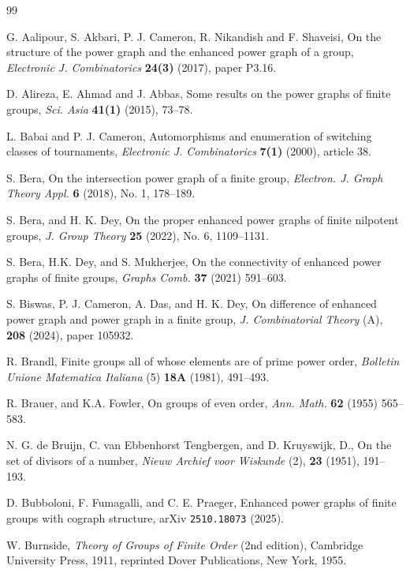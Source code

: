 \documentclass[12pt]{amsart}
\theoremstyle{plain}
\theoremstyle{remark}
\theoremstyle{definition}
\begin{document}
\begin{thebibliography}{99}

G. Aalipour, S. Akbari, P. J. Cameron, R. Nikandish and F. Shaveisi,
On the structure of the power graph and the enhanced power graph of a group,
\textit{Electronic J. Combinatorics} \textbf{24(3)} (2017), paper P3.16.

D. Alireza, E. Ahmad and J. Abbas, Some results on the power graphs of finite groups,
 \textit{Sci. Asia} \textbf{41(1)} (2015), 73--78.

L. Babai and P. J. Cameron, 
Automorphisms and enumeration of switching classes of tournaments,
\textit{Electronic J. Combinatorics} \textbf{7(1)} (2000), article 38.

S. Bera,
On the intersection power graph of a finite group,
\textit{Electron. J. Graph Theory Appl.} \textbf{6} (2018), No. 1, 178--189.

S. Bera, and H. K. Dey,
On the proper enhanced power graphs of finite nilpotent groups,
\textit{J.  Group Theory} \textbf{25} (2022), No. 6, 1109--1131.

S. Bera, H.K. Dey, and S. Mukherjee, On the connectivity of enhanced power graphs of finite groups,
\textit{Graphs Comb.} \textbf{37} (2021) 591--603.

S. Biswas, P. J. Cameron, A. Das, and H. K. Dey,
On difference of enhanced power graph and power graph in a finite group,
\textit{J. Combinatorial Theory} (A), \textbf{208} (2024), paper 105932.

R. Brandl,
Finite groups all of whose elements are of prime power order,
\textit{Bolletin Unione Matematica Italiana} (5) \textbf{18A} (1981), 491--493.

 R. Brauer, and K.A. Fowler, On groups of even order, \textit{Ann. Math.} \textbf{62} (1955) 565--583.

N. G. de Bruijn, C. van Ebbenhorst Tengbergen, and D. Kruyswijk, D.,
On the set of divisors of a number,
\textit{Nieuw Archief voor Wiskunde} (2), \textbf{23} (1951), 191--193.

D. Bubboloni, F. Fumagalli, and C. E. Praeger,
Enhanced power graphs of finite groups with cograph structure,
arXiv \texttt{2510.18073} (2025).

W. Burnside,
\textit{Theory of Groups of Finite Order} (2nd edition),
Cambridge University Press, 1911, reprinted Dover Publications, New York, 1955.


\end{thebibliography}
\end{document}
